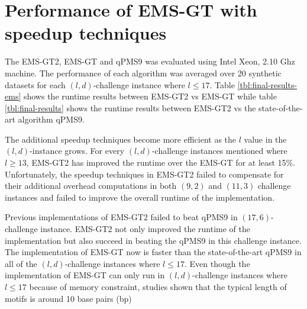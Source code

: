 \section{Performance of EMS-GT with speedup techniques}








The EMS-GT2, EMS-GT and qPMS9 was evaluated using Intel Xeon, 2.10 Ghz machine. The performance of each algorithm was averaged over 20 synthetic datasets for each $(l, d)$-challenge instance where $l \leq 17$. Table \ref{tbl:final-results-ems} shows the runtime results between EMS-GT2 vs EMS-GT while table \ref{tbl:final-results} shows the runtime results between EMS-GT2 vs the state-of-the-art algorithm qPMS9.


The additional speedup techniques become more efficient as the $l$ value in the $(l, d)$-instance grows. For every $(l, d)$-challenge instances mentioned where $l \geq 13$, EMS-GT2 has improved the runtime over the EMS-GT for at least 15\%. Unfortunately, the speedup techniques in EMS-GT2 failed to compensate for their additional overhead computations in both $(9, 2)$ and $(11, 3)$ challenge instances and failed to improve the overall runtime of the implementation.


Previous implementations of EMS-GT2 failed to beat qPMS9 in $(17, 6)$-challenge instance. EMS-GT2 not only improved the runtime of the implementation but also succeed in beating the qPMS9 in this challenge instance. The implementation of EMS-GT now is faster than the state-of-the-art qPMS9 in all of the $(l, d)$-challenge instances where $l \leq 17$. Even though the implementation of EMS-GT can only run in $(l, d)$-challenge instances where $l \leq 17$ because of memory constraint, studies shown that the typical length of motifs is around 10 base pairs (bp) \cite{stewart2012transcription}







